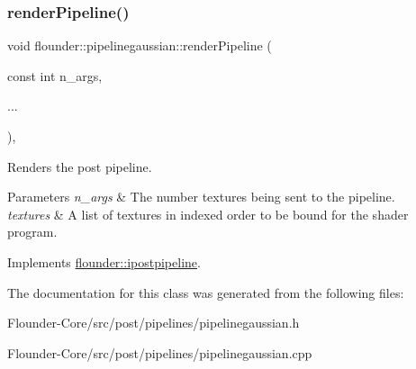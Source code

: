 \mbox{\label{classflounder_1_1pipelinegaussian_a2d6372f1b428c3a09bf6fc2efaee3c83}} 
\subsubsection{\texorpdfstring{render\+Pipeline()}{renderPipeline()}}
{\footnotesize\ttfamily void flounder\+::pipelinegaussian\+::render\+Pipeline (\begin{DoxyParamCaption}\item[{const int}]{n\+\_\+args,  }\item[{}]{... }\end{DoxyParamCaption})\hspace{0.3cm}{\ttfamily [override]}, {\ttfamily [virtual]}}



Renders the post pipeline. 


\begin{DoxyParams}{Parameters}
{\em n\+\_\+args} & The number textures being sent to the pipeline. \\
\hline
{\em textures} & A list of textures in indexed order to be bound for the shader program. \\
\hline
\end{DoxyParams}


Implements \hyperlink{classflounder_1_1ipostpipeline_a975b354967fa358076d02380feb55265}{flounder\+::ipostpipeline}.



The documentation for this class was generated from the following files\+:\begin{DoxyCompactItemize}
\item 
Flounder-\/\+Core/src/post/pipelines/pipelinegaussian.\+h\item 
Flounder-\/\+Core/src/post/pipelines/pipelinegaussian.\+cpp\end{DoxyCompactItemize}
